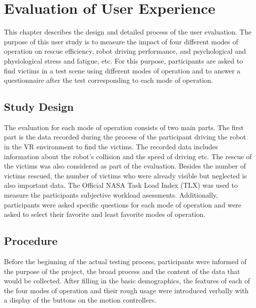 \chapter{Evaluation of User Experience}
\label{evaluate}


This chapter describes the design and detailed process of the user evaluation. The purpose of this user study is to measure the impact of four different modes of operation on rescue efficiency, robot driving performance, and psychological and physiological stress and fatigue, etc. For this purpose, participants are asked to find victims in a test scene using different modes of operation and to answer a questionnaire after the test corresponding to each mode of operation.



\section{Study Design}

The evaluation for each mode of operation consists of two main parts. The first part is the data recorded during the process of the participant driving the robot in the VR environment to find the victims. The recorded data includes information about the robot's collision and the speed of driving etc. The rescue of the victims was also considered as part of the evaluation. Besides the number of victims rescued, the number of victims who were already visible but neglected is also important data. The Official NASA Task Load Index (TLX) was used to measure the participants subjective workload asessments. Additionally, participants were asked specific questions for each mode of operation and were asked to select their favorite and least favorite modes of operation.



\section{Procedure}
Before the beginning of the actual testing process, participants were informed of the purpose of the project, the broad process and the content of the data that would be collected. After filling in the basic demographics, the features of each of the four modes of operation and their rough usage were introduced verbally with a display of the buttons on the motion controllers.



